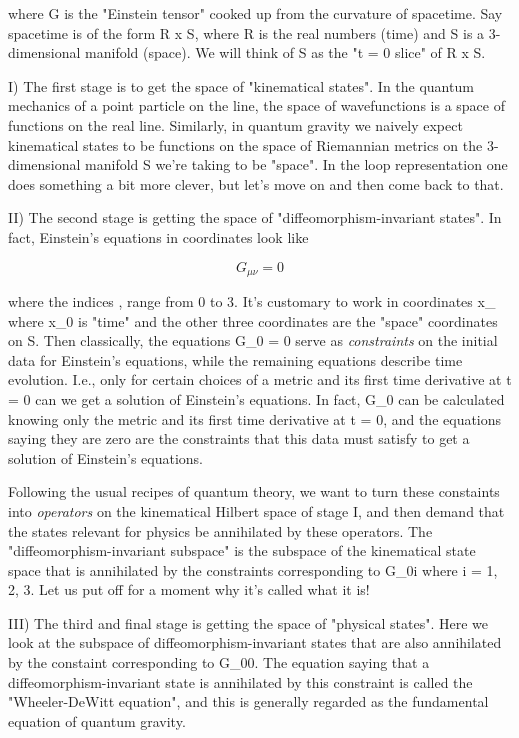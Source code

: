 where G is the "Einstein tensor" cooked up from the curvature of
spacetime.  Say spacetime is of the form R x S, where R is the real
numbers (time) and S is a 3-dimensional manifold (space).  We will think
of S as the "t = 0 slice" of R x S.  

I) The first stage is to get the space of "kinematical states".  In the
quantum mechanics of a point particle on the line, the space of
wavefunctions is a space of functions on the real line.  Similarly, in
quantum gravity we naively expect kinematical states to be functions on
the space of Riemannian metrics on the 3-dimensional manifold S we're
taking to be "space".  In the loop representation one does something a
bit more clever, but let's move on and then come back to that.

II) The second stage is getting the space of "diffeomorphism-invariant
states".  In fact, Einstein's equations in coordinates look like


$$

                          G_{\mu  \nu } = 0
$$
    

where the indices \mu , \nu  range from 0 to 3.  It's customary to work in
coordinates x_{\mu } where x_0 is "time" and the other three coordinates
are the "space" coordinates on S.  Then classically, the equations 
G_{0 \mu } = 0 serve as \emph{constraints} on the initial data for Einstein's
equations, while the remaining equations describe time evolution.  I.e.,
only for certain choices of a metric and its first time derivative at t
= 0 can we get a solution of Einstein's equations.  In fact, G_{0 \mu }
can be calculated knowing only the metric and its first time derivative
at t = 0, and the equations saying they are zero are the constraints
that this data must satisfy to get a solution of Einstein's equations.

Following the usual recipes of quantum theory, we want to turn these
constaints into \emph{operators} on the kinematical Hilbert space of stage
I, and then demand that the states relevant for physics be annihilated
by these operators.  The "diffeomorphism-invariant subspace" is the
subspace of the kinematical state space that is annihilated by the
constraints corresponding to G_{0i} where i = 1, 2, 3.  Let us put off
for a moment why it's called what it is!

III) The third and final stage is getting the space of "physical states".
Here we look at the subspace of diffeomorphism-invariant states that are
also annihilated by the constaint corresponding to G_{00}.  The equation
saying that a diffeomorphism-invariant state is annihilated by this
constraint is called the "Wheeler-DeWitt equation", and this is generally
regarded as the fundamental equation of quantum gravity.  


